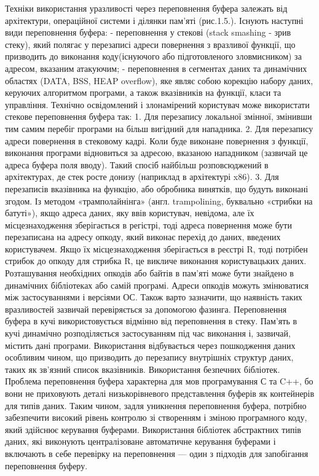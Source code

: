 \documentclass[oneside,final,14pt]{extreport}
\begin{document}
Техніки використання уразливості через переповнення буфера залежать від архітектури, операційної системи і ділянки пам'яті (рис.1.5.).
Існують наступні види переповнення буфера:
-   переповнення у стекові (stack smashing - зрив стеку), який полягає у перезаписі адреси повернення з вразливої функції, що призводить до виконання коду(існуючого або підготовленого зловмисником) за адресом, вказаним атакуючим;
-   переповнення в сегментах даних та динамічних областях (DATA, BSS, HEAP overflow), яке являє собою корекцію набору даних, керуючих алгоритмом програми, а також вказівників на функції, класи та управління.
Технічно освідомлений і злонамірений користувач може використати стекове переповнення буфера так:
1.  Для перезапису локальної змінної, змінивши тим самим перебіг програми на більш вигідний для нападника.
2.  Для перезапису адреси повернення в стековому кадрі. Коли буде виконане повернення з функції, виконання програми відновиться за адресою, вказаною нападником (зазвичай це адреса буфера поля вводу). Такий спосіб найбільш розповсюджений в архітектурах, де стек росте донизу (наприклад в архітектурі x86).
3.  Для перезаписів вказівника на функцію, або обробника винятків, що будуть виконані згодом.
Із методом «трамполайнінга» (англ. trampolining, буквально «стрибки на батуті»), якщо адреса даних, яку ввів користувач, невідома, але їх місцезнаходження зберігається в регістрі, тоді адреса повернення може бути перезаписана на адресу опкоду, який виконає перехід до даних, введених користувачем. Якщо їх місцезнаходження зберігається в реєстрі R, тоді потрібен стрибок до опкоду для стрибка R, це викличе виконання користувацьких даних. Розташування необхідних опкодів або байтів в пам'яті може бути знайдено в динамічних бібліотеках або самій програмі. Адреси опкодів можуть змінюватися між застосуваннями і версіями ОС.
Також варто зазначити, що наявність таких вразливостей зазвичай перевіряється за допомогою фазинга.
Переповнення буфера в кучі використовується відмінно від переповнення в стеку. Пам'ять в кучі динамічно розподіляється застосуванням під час виконання і, зазвичай, містить дані програми. Використання відбувається через пошкодження даних особливим чином, що призводить до перезапису внутрішніх структур даних, таких як зв'язний список вказівників.
Використання безпечних бібліотек. Проблема переповнення буфера характерна для мов програмування С та C++, бо вони не приховують деталі низькорівневого представлення буферів як контейнерів для типів даних. Таким чином, задля уникнення переповнення буфера, потрібно забезпечити високий рівень контролю зі створенням і зміною програмного коду, який здійснює керування буферами. Використання бібліотек абстрактних типів даних, які виконують централізоване автоматичне керування буферами і включають в себе перевірку на переповнення — один з підходів для запобігання переповнення буферу.
\end{document}
